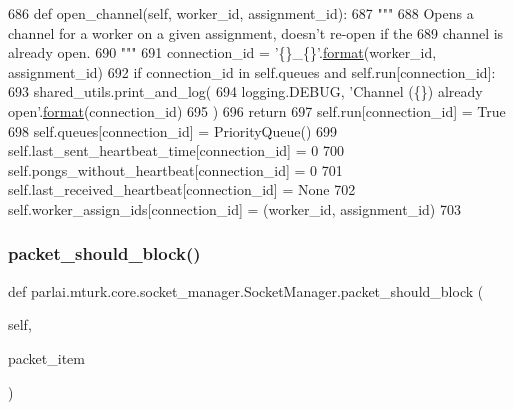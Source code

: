 \begin{DoxyCode}
686     \textcolor{keyword}{def }open\_channel(self, worker\_id, assignment\_id):
687         \textcolor{stringliteral}{"""}
688 \textcolor{stringliteral}{        Opens a channel for a worker on a given assignment, doesn't re-open if the}
689 \textcolor{stringliteral}{        channel is already open.}
690 \textcolor{stringliteral}{        """}
691         connection\_id = \textcolor{stringliteral}{'\{\}\_\{\}'}.\hyperlink{namespaceparlai_1_1chat__service_1_1services_1_1messenger_1_1shared__utils_a32e2e2022b824fbaf80c747160b52a76}{format}(worker\_id, assignment\_id)
692         \textcolor{keywordflow}{if} connection\_id \textcolor{keywordflow}{in} self.queues \textcolor{keywordflow}{and} self.run[connection\_id]:
693             shared\_utils.print\_and\_log(
694                 logging.DEBUG, \textcolor{stringliteral}{'Channel (\{\}) already open'}.\hyperlink{namespaceparlai_1_1chat__service_1_1services_1_1messenger_1_1shared__utils_a32e2e2022b824fbaf80c747160b52a76}{format}(connection\_id)
695             )
696             \textcolor{keywordflow}{return}
697         self.run[connection\_id] = \textcolor{keyword}{True}
698         self.queues[connection\_id] = PriorityQueue()
699         self.last\_sent\_heartbeat\_time[connection\_id] = 0
700         self.pongs\_without\_heartbeat[connection\_id] = 0
701         self.last\_received\_heartbeat[connection\_id] = \textcolor{keywordtype}{None}
702         self.worker\_assign\_ids[connection\_id] = (worker\_id, assignment\_id)
703 
\end{DoxyCode}
\mbox{\label{classparlai_1_1mturk_1_1core_1_1socket__manager_1_1SocketManager_a7b41199438da8694cc9c8d9b3e58da85}} 
\subsubsection{\texorpdfstring{packet\+\_\+should\+\_\+block()}{packet\_should\_block()}}
{\footnotesize\ttfamily def parlai.\+mturk.\+core.\+socket\+\_\+manager.\+Socket\+Manager.\+packet\+\_\+should\+\_\+block (\begin{DoxyParamCaption}\item[{}]{self,  }\item[{}]{packet\+\_\+item }\end{DoxyParamCaption})}

